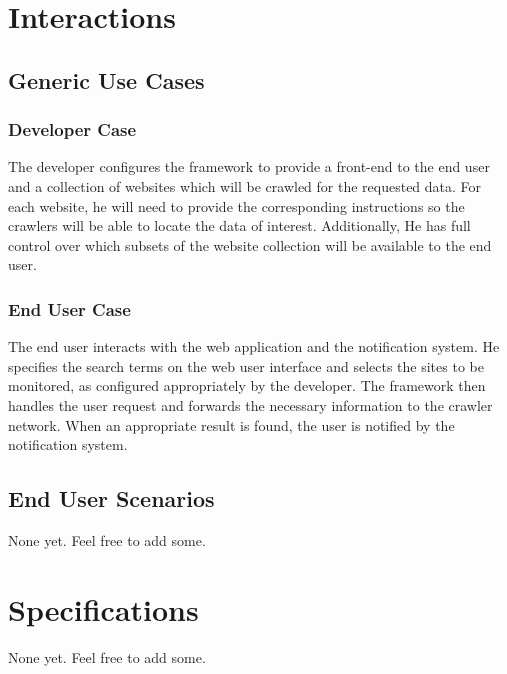\documentclass[a4paper,10pt]{article} \usepackage{anysize}
\begin{document}
\section{Interactions}
    \subsection{Generic Use Cases}
        \subsubsection{Developer Case}
            The developer configures the framework to provide a front-end to the end user
            and a collection of websites which will be crawled for the requested data.
            For each website, he will need to provide the corresponding instructions
            so the crawlers will be able to locate the data of interest.
            Additionally, He has full control over which subsets of the website collection
            will be available to the end user.
        \subsubsection{End User Case}
            The end user interacts with the web application and the notification
            system. He specifies the search terms on the web user interface and selects
            the sites to be monitored, as configured appropriately by the developer. 
            The framework then handles the user request and forwards the necessary 
            information to the crawler network. When an appropriate result is found, 
            the user is notified by the notification system.

    \subsection{End User Scenarios}
        None yet. Feel free to add some.

\section{Specifications}
    None yet. Feel free to add some.
\end{document}
